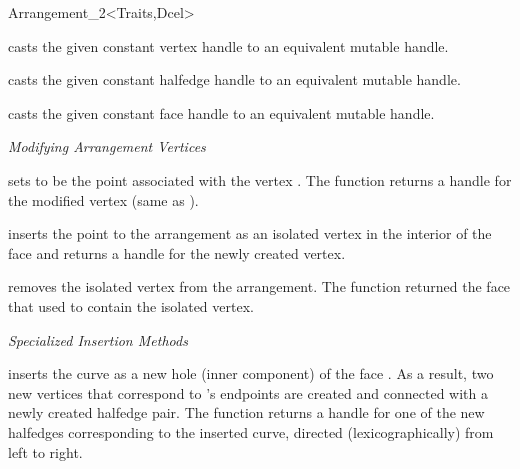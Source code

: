 \begin{ccRefClass}{Arrangement_2<Traits,Dcel>}
\begin{ccAdvanced}
 
    {casts the given constant vertex handle to an equivalent mutable handle.}

    {casts the given constant halfedge handle to an equivalent mutable handle.}

    {casts the given constant face handle to an equivalent mutable handle.}

\end{ccAdvanced}

\ccModifiers

{\sl Modifying Arrangement Vertices}

   {sets  to be the point associated with the vertex .
    The function returns a handle for the modified vertex (same as ).
    }

   {inserts the point  to the arrangement as an isolated vertex in
    the interior of the face  and returns a handle for the newly
    created vertex.}

   {removes the isolated vertex  from the arrangement. The function
    returned the face  that used to contain the isolated vertex.
    }

{\sl Specialized Insertion Methods}

   {inserts the curve  as a new hole (inner component) of the face
    . As a result, two new vertices that correspond to 's
    endpoints are created and connected with a newly created halfedge pair.
    The function returns a handle for one of the new halfedges
    corresponding to the inserted curve, directed (lexicographically)
    from left to right.
    }


\end{ccRefClass}
